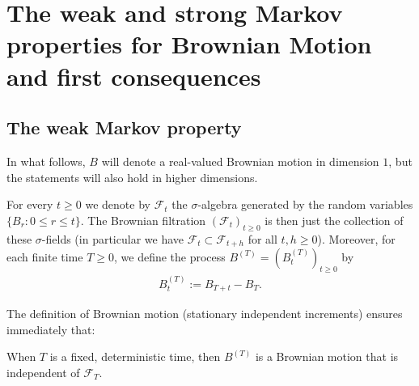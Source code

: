 \documentclass[../mainfile.tex]{subfiles}
\begin{document}
\section{The weak and strong Markov properties for Brownian Motion and first consequences}
\subsection{The weak Markov property}
In what follows, $B$ will denote a real-valued Brownian motion  in dimension $1$, but the statements will also hold in higher dimensions. 
\begin{defn}For every $t \geq 0$ we denote by $\mathcal{F}_t$ the $\sigma$-algebra generated by the random variables $\{B_r : 0 \leq r \leq t \}$. The Brownian filtration $( \mathcal{F}_t)_{t \geq 0}$ is then just the collection of these $\sigma$-fields (in particular we have $\mathcal{F}_t \subset \mathcal{F}_{t+h}$ for all $t,h \geq 0$). Moreover, for each finite time $T \geq 0$, we define the process $B^{(T)}=(B_t^{(T)})_{t \geq 0 }$ by \begin{align*}
B_t^{(T)}:= B_{T+t}-B_T.
\end{align*}
\end{defn}
The definition of Brownian motion (stationary independent increments) ensures immediately that:
\begin{lem} When $T$ is a fixed, deterministic time, then $B^{(T)}$ is a Brownian motion that is independent of $\mathcal{F}_T$. 
\end{lem}
\end{document}
